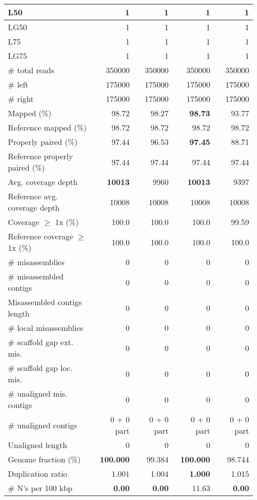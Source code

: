 \documentclass[12pt,a4paper]{article}
\begin{document}
\begin{table}[ht]
\begin{center}
\begin{tabular}{|l*{4}{|r}|}
L50 & 1 & 1 & 1 & 1 \\ \hline
LG50 & 1 & 1 & 1 & 1 \\ \hline
L75 & 1 & 1 & 1 & 1 \\ \hline
LG75 & 1 & 1 & 1 & 1 \\ \hline
\# total reads & 350000 & 350000 & 350000 & 350000 \\ \hline
\# left & 175000 & 175000 & 175000 & 175000 \\ \hline
\# right & 175000 & 175000 & 175000 & 175000 \\ \hline
Mapped (\%) & 98.72 & 98.27 & {\bf 98.73} & 93.77 \\ \hline
Reference mapped (\%) & 98.72 & 98.72 & 98.72 & 98.72 \\ \hline
Properly paired (\%) & 97.44 & 96.53 & {\bf 97.45} & 88.71 \\ \hline
Reference properly paired (\%) & 97.44 & 97.44 & 97.44 & 97.44 \\ \hline
Avg. coverage depth & {\bf 10013} & 9960 & {\bf 10013} & 9397 \\ \hline
Reference avg. coverage depth & 10008 & 10008 & 10008 & 10008 \\ \hline
Coverage $\geq$ 1x (\%) & 100.0 & 100.0 & 100.0 & 99.59 \\ \hline
Reference coverage $\geq$ 1x (\%) & 100.0 & 100.0 & 100.0 & 100.0 \\ \hline
\# misassemblies & 0 & 0 & 0 & 0 \\ \hline
\# misassembled contigs & 0 & 0 & 0 & 0 \\ \hline
Misassembled contigs length & 0 & 0 & 0 & 0 \\ \hline
\# local misassemblies & 0 & 0 & 0 & 0 \\ \hline
\# scaffold gap ext. mis. & 0 & 0 & 0 & 0 \\ \hline
\# scaffold gap loc. mis. & 0 & 0 & 0 & 0 \\ \hline
\# unaligned mis. contigs & 0 & 0 & 0 & 0 \\ \hline
\# unaligned contigs & 0 + 0 part & 0 + 0 part & 0 + 0 part & 0 + 0 part \\ \hline
Unaligned length & 0 & 0 & 0 & 0 \\ \hline
Genome fraction (\%) & {\bf 100.000} & 99.384 & {\bf 100.000} & 98.744 \\ \hline
Duplication ratio & 1.001 & 1.004 & {\bf 1.000} & 1.015 \\ \hline
\# N's per 100 kbp & {\bf 0.00} & {\bf 0.00} & 11.63 & {\bf 0.00} \\ \hline

\end{tabular}
\end{center}
\end{table}
\end{document}
